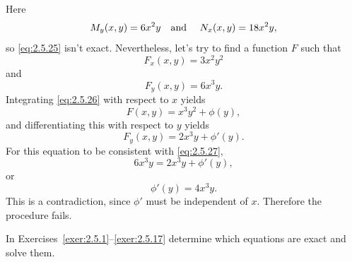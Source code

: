 \begin{examplesolution}
\solution Here
\[
  M_{y}(x,y)=6x^{2}y\mbox{\quad and \quad }N_{x}(x,y)=18x^{2}y,
\]
so \eqref{eq:2.5.25} isn't exact. Nevertheless, let's try to find a function $F$ such that
\begin{equation}
  \label{eq:2.5.26}F_{x}(x,y)=3x^{2}y^{2}
\end{equation}
and
\begin{equation}
  \label{eq:2.5.27}F_{y}(x,y)=6x^{3}y.
\end{equation}
Integrating \eqref{eq:2.5.26} with respect to $x$ yields
\[
  F(x,y)=x^{3}y^{2}+\phi(y),
\]
and differentiating this with respect to $y$ yields
\[
  F_{y}(x,y)=2x^{3}y+\phi'(y).
\]
For this equation to be consistent with \eqref{eq:2.5.27},
\[
  6x^{3}y=2x^{3}y+\phi'(y),
\]
or
\[
  \phi'(y)=4x^{3}y.
\]
This is a contradiction, since $\phi'$ must be independent of $x$. Therefore the procedure fails.
\end{examplesolution}

\exercises In Exercises~\ref{exer:2.5.1}--\ref{exer:2.5.17} determine which equations are exact and solve them.

